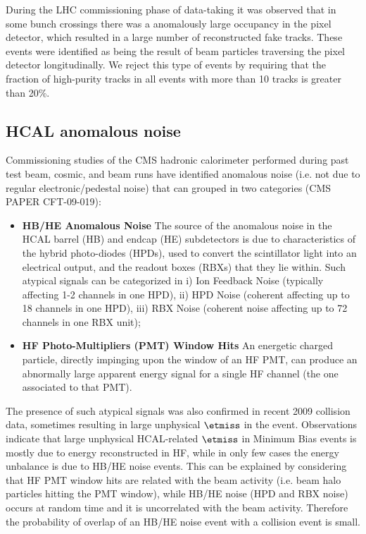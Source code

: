 During the LHC commissioning phase of data-taking it was observed that
in some bunch crossings there was a anomalously large occupancy in the
pixel detector, which resulted in a large number of reconstructed fake
tracks. These events were identified as being the result of beam
particles traversing the pixel detector longitudinally. We reject this
type of events by requiring that the fraction of high-purity tracks in
all events with more than 10 tracks is greater than 20\%.

\subsection{HCAL anomalous noise}
Commissioning studies of the CMS hadronic calorimeter performed 
during past test beam, cosmic, and beam runs have 
identified anomalous noise (i.e. not due to regular 
electronic/pedestal noise) that can grouped in two categories 
(CMS PAPER CFT-09-019):
\begin{itemize}
\item{\bf HB/HE Anomalous Noise} The source of the anomalous noise in the HCAL 
barrel (HB) and endcap (HE) subdetectors is due to characteristics 
of the hybrid photo-diodes (HPDs), used to convert the scintillator light into 
an electrical output, and the readout boxes (RBXs) that they lie within.
Such atypical signals can be categorized 
in i) Ion Feedback Noise (typically affecting 1-2 channels in one HPD), ii) HPD Noise 
(coherent affecting up to 18 channels in one HPD), iii) RBX Noise 
(coherent noise affecting up to 72 channels in one RBX unit);
\item{\bf HF Photo-Multipliers (PMT) Window Hits} An energetic charged particle, directly 
impinging upon the window of an HF PMT, can produce an abnormally large apparent 
energy signal for a single HF channel (the one associated to that PMT). 
\end{itemize}

The presence of such atypical signals was also confirmed in recent 
2009 collision data, sometimes resulting in large unphysical $\etmiss$ in the event. 
Observations indicate that large unphysical HCAL-related $\etmiss$ 
in Minimum Bias events is mostly due to energy reconstructed in HF, 
while in only few cases the energy unbalance is due to HB/HE noise events. 
This can be explained by considering that HF PMT window hits 
are related with the beam activity (i.e. beam halo particles hitting the PMT window), 
while HB/HE noise (HPD and RBX noise) occurs at random time and it is 
uncorrelated with the beam activity. Therefore the probability of overlap 
of an HB/HE noise event with a collision event is small.

